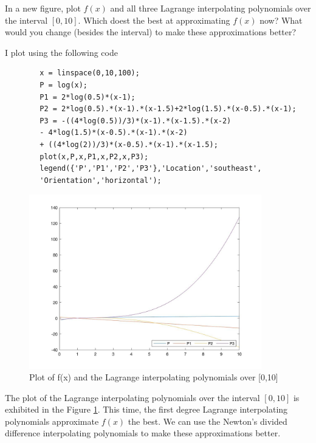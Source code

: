 \begin{question}
    In a new figure, plot $f(x)$ and all three Lagrange interpolating polynomials over the interval $[0,10]$. Which doest the best at approximating $f(x)$ now? What would you change (besides the interval) to make these approximations better?
\end{question}

\begin{answer}
    I plot using the following code
    \begin{verbatim}
        x = linspace(0,10,100);
        P = log(x);
        P1 = 2*log(0.5)*(x-1);
        P2 = 2*log(0.5).*(x-1).*(x-1.5)+2*log(1.5).*(x-0.5).*(x-1);
        P3 = -((4*log(0.5))/3)*(x-1).*(x-1.5).*(x-2) 
        - 4*log(1.5)*(x-0.5).*(x-1).*(x-2) 
        + ((4*log(2))/3)*(x-0.5).*(x-1).*(x-1.5);
        plot(x,P,x,P1,x,P2,x,P3);
        legend({'P','P1','P2','P3'},'Location','southeast',
        'Orientation','horizontal');
    \end{verbatim}
    \begin{figure}[H]
        \centering
        \includegraphics[width=0.9\textwidth]{Figure 6.jpg}
        \caption{\label{fig:fig6}Plot of f(x) and the Lagrange interpolating polynomials over [0,10]}
    \end{figure}
    The plot of the Lagrange interpolating polynomials over the interval $[0,10]$ is exhibited in the Figure \ref{fig:fig6}. This time, the first degree Lagrange interpolating polynomials approximate $f(x)$ the best. We can use the Newton's divided difference interpolating polynomials to make these approximations better.
\end{answer}